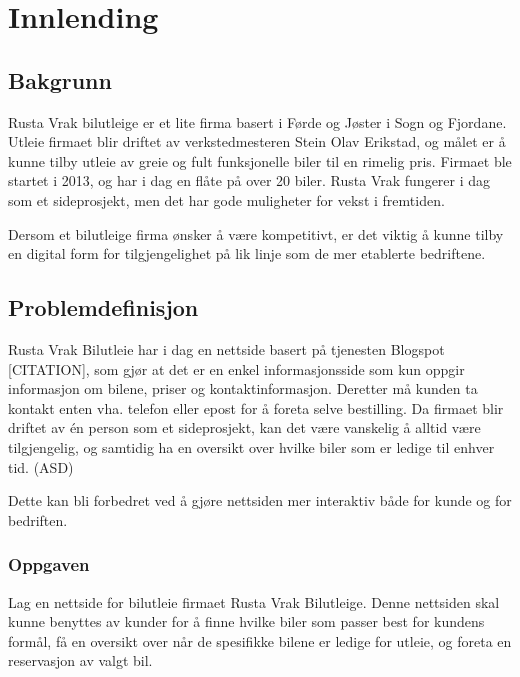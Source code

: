 \chapter{Innlending}


\section{Bakgrunn}
Rusta Vrak bilutleige er et lite firma basert i Førde og Jøster i Sogn og Fjordane. Utleie firmaet blir driftet av verkstedmesteren Stein Olav Erikstad, og målet er å kunne tilby utleie av greie og fult funksjonelle biler til en rimelig pris. Firmaet ble startet i 2013, og har i dag en flåte på over 20 biler. Rusta Vrak fungerer i dag som et sideprosjekt, men det har gode muligheter for vekst i fremtiden.\cite{bachelor}

Dersom et bilutleige firma ønsker å være kompetitivt, er det viktig å kunne tilby en digital form for tilgjengelighet på lik linje som de mer etablerte bedriftene.  


\section{Problemdefinisjon}
Rusta Vrak Bilutleie har i dag en nettside basert på tjenesten Blogspot [CITATION], som gjør at det er en enkel informasjonsside som kun oppgir informasjon om bilene, priser og kontaktinformasjon. Deretter må kunden ta kontakt enten vha. telefon eller epost for å foreta selve bestilling. Da firmaet blir driftet av én person som et sideprosjekt, kan det være vanskelig å alltid være tilgjengelig, og samtidig ha en oversikt over hvilke biler som er ledige til enhver tid. (ASD)

Dette kan bli forbedret ved å gjøre nettsiden mer interaktiv både for kunde og for bedriften. 

\subsection{Oppgaven}
Lag en nettside for bilutleie firmaet Rusta Vrak Bilutleige. Denne nettsiden skal kunne benyttes av kunder for å finne hvilke biler som passer best for kundens formål, få en oversikt over når de spesifikke bilene er ledige for utleie, og foreta en reservasjon av valgt bil.

